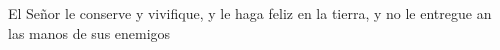     {El Señor le conserve y vivifique, y le haga feliz en la tierra, y no le entregue an las manos de sus enemigos}

